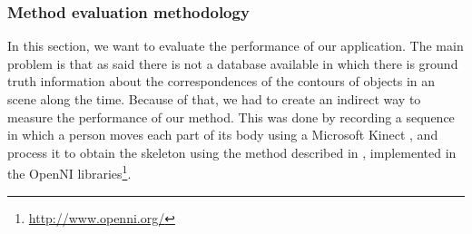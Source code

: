 \subsubsection{Method evaluation methodology}\label{ch:chapter02_02_03_01}

In this section, we want to evaluate the performance of our application. The main problem is that as said there is not a 
database available in which there is ground truth information about the correspondences of the contours of objects in 
an scene along the time. Because of that, we had to create an indirect way to measure the performance of our method. This was done by recording a sequence in which a person moves each part of its body using a Microsoft 
Kinect \textregistered, and process it to obtain the skeleton using the method described in \cite{shotton2013real}, 
implemented in the OpenNI libraries\footnote{\url{http://www.openni.org/}}.

